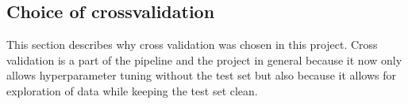 \subsection{Choice of crossvalidation}

This section describes why cross validation was chosen in this project. Cross validation is a part of the pipeline and the project in general because it now only allows hyperparameter tuning without the test set but also because it allows for exploration of data while keeping the test set clean. \cite{james-statistical-learning}
